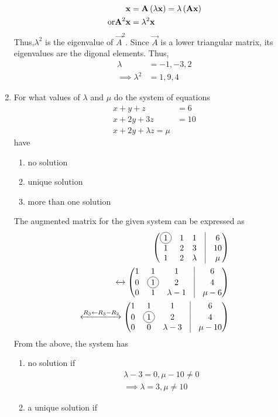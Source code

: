 \documentclass[journal,12pt,twocolumn]{IEEEtran}
\renewcommand\thesection{\arabic{section}}
\begin{document}
\begin{enumerate}[label=\thesection.\arabic*.,ref=\thesection.\theenumi]
\begin{align}
{	\mathbf{x}} &= \mathbf{A}\left(\lambda
	\mathbf{x}\right) =\lambda \left(\mathbf{A}
	\mathbf{x}\right) 
	\\
	\text{or} 
	\mathbf{A}^2
	\mathbf{x} &= \lambda^2
	\mathbf{x}
\end{align}
		Thus,$\lambda^2$ is the eigenvalue of $\vec{A}^2$.  Since $\vec{A}$ is
a lower triangular matrix, its eigenvalues are the digonal elements.  Thus,
\begin{align}
	\lambda &= -1,-3,2
	\\
	\implies 
	\lambda^2 &= 1,9,4
\end{align}
\item For what values of $\lambda$ and $\mu$ do the system of equations
\begin{align}
	x+y+z &= 6
	\\
	x+2y+3z &= 10
	\\
	x+2y+\lambda z = \mu
\end{align}
have
		\begin{enumerate}
			\item no solution
			\item unique solution
			\item more than one solution
				\end{enumerate}
				\solution  The augmented matrix for the given system can be expressed as
\begin{align}
	\myvec{\circled{1} & 1 & 1 & \vrule &  6\\ 1 & 2 & 3 & \vrule &10\\ 1 & 2 & \lambda & \vrule &\mu} 
	\\
	\xleftrightarrow[]{}
	\myvec{1 & 1 & 1 & \vrule &  6\\ 0 & \circled{1} & 2 & \vrule & 4\\ 0 &  1 &\lambda -1  & \vrule &\mu-6}
	\\
	\xleftrightarrow[]{R_3 \leftarrow R_3 - R_2}
	\myvec{1 & 1 & 1 & \vrule &  6\\ 0 & \circled{1} & 2 & \vrule & 4\\ 0 &  0 &\lambda -3  & \vrule &\mu-10}
  \end{align}
  From the above, the system has 
		\begin{enumerate}
			\item  no solution if 
\begin{align}
	\lambda -3 = 0, \mu - 10 \ne 0
	\\
	\implies 
	\lambda = 3, \mu \ne 10
  \end{align}
			\item  a unique solution if 

\end{enumerate}
\end{enumerate}
\end{document}
